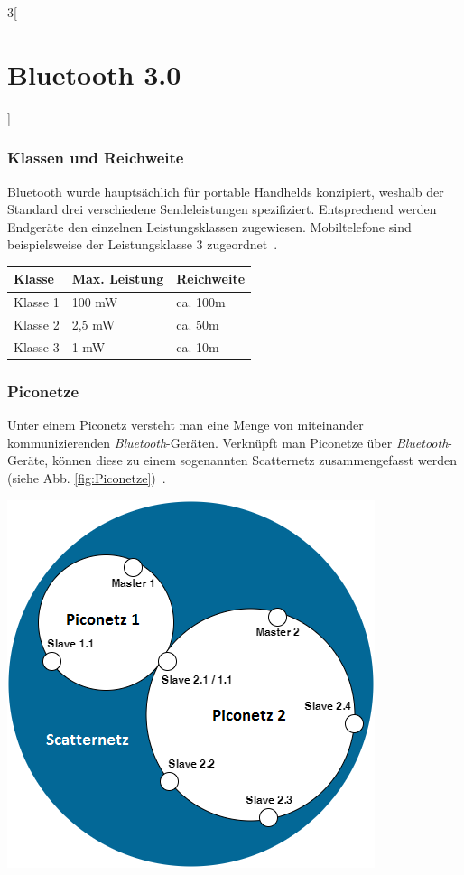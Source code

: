 \begin{multicols}{3}[\section{Bluetooth 3.0}]
\subsubsection*{Klassen und Reichweite}
Bluetooth wurde hauptsächlich für portable Handhelds konzipiert, weshalb der Standard drei verschiedene Sendeleistungen spezifiziert. Entsprechend werden Endgeräte den einzelnen Leistungsklassen zugewiesen. Mobiltelefone sind beispielsweise der Leistungsklasse 3 zugeordnet~\cite{bluetooth3.0.5}. \\

\noindent
\begin{boxedminipage}{\linewidth}
\begin{tabular}{p{} | p{} | p{}}
      \textbf{Klasse} & \textbf{Max. Leistung} & \textbf{Reichweite} \\
      \hline
      Klasse 1 & 100 mW & ca. 100m \\
      \hline
      Klasse 2 & 2,5 mW & ca. 50m \\
      \hline
      Klasse 3 & 1 mW & ca. 10m \\
\end{tabular}
\end{boxedminipage}

\subsubsection*{Piconetze}
Unter einem Piconetz versteht man eine Menge von miteinander kommunizierenden \textit{Bluetooth}-Geräten. Verknüpft man Piconetze über \textit{Bluetooth}-Geräte, können diese zu einem sogenannten Scatternetz zusammengefasst werden (siehe Abb. \ref{fig:Piconetze})~\cite{bluetooth3.0.3}.

\begin{Figure}
\begin{center}
\includegraphics[scale=0.4]{Kapitel/Bluetooth3.0/Grafiken/piconetze.png}
\end{center}
\label{fig:Piconetze}
\end{Figure}


\end{multicols}
